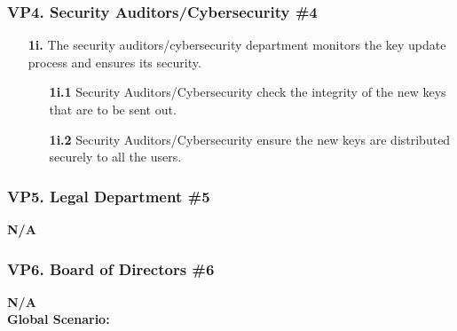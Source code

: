 \documentclass[]{article}
\begin{document}
\subsubsection*{VP4. Security Auditors/Cybersecurity \#4}
\begin{enumerate}
	\item[\textbf{1i.}] The security auditors/cybersecurity department monitors the key update process and ensures its security.
		\begin{enumerate}
			\item[\textbf{1i.1}] Security Auditors/Cybersecurity check the integrity of the new keys that are to be sent out.
			\item[\textbf{1i.2}] Security Auditors/Cybersecurity ensure the new keys are distributed securely to all the users.
		\end{enumerate}
\end{enumerate}
\subsubsection*{VP5. Legal Department \#5}
\textbf{N/A}
\subsubsection*{VP6. Board of Directors \#6}
\textbf{N/A}\\

\noindent \textbf{Global Scenario:}
\end{document}
